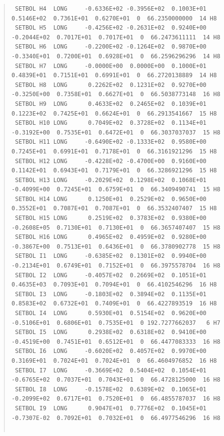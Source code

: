\documentclass[twoside,11pt]{article}
\newenvironment{myquote}{\begin{quote}\begin{small}}{\end{small}\end{quote}}
\renewcommand{\_}{\texttt{\symbol{95}}}
\begin{document}
\begin{landscape}
\begin{myquote}
\begin{verbatim}
 SETBOL H4  LONG     -0.6336E+02 -0.3956E+02  0.1003E+01  0.5146E+02  0.7361E+01  0.6270E+01  0  66.2350000000  14 H8
 SETBOL H5  LONG     -0.4256E+02 -0.2631E+02  0.9240E+00 -0.2044E+02  0.7017E+01  0.7017E+01  0  66.2473611111  14 H8
 SETBOL H6  LONG     -0.2200E+02 -0.1264E+02  0.9870E+00 -0.3340E+01  0.7200E+01  0.6928E+01  0  66.2596296296  14 H8
 SETBOL H7  LONG     -0.0000E+00  0.0000E+00  0.1000E+01  0.4839E+01  0.7151E+01  0.6991E+01  0  66.2720138889  14 H8
 SETBOL H8  LONG      0.2262E+02  0.1231E+02  0.9270E+00 -0.3250E+00  0.7358E+01  0.6627E+01  0  66.5038773148  16 H8
 SETBOL H9  LONG      0.4633E+02  0.2465E+02  0.1039E+01  0.1223E+02  0.7425E+01  0.6624E+01  0  66.2913541667  15 H8
 SETBOL H10 LONG      0.7049E+02  0.3728E+02  0.1134E+01 -0.3192E+00  0.7535E+01  0.6472E+01  0  66.3037037037  15 H8
 SETBOL H11 LONG     -0.6490E+02 -0.1333E+02  0.9580E+00  0.7245E+01  0.6991E+01  0.7178E+01  0  66.3161921296  15 H8
 SETBOL H12 LONG     -0.4228E+02 -0.4700E+00  0.9160E+00  0.1142E+01  0.6943E+01  0.7179E+01  0  66.3286921296  15 H8
 SETBOL H13 LONG     -0.2029E+02  0.1298E+02  0.1068E+01 -0.4099E+00  0.7245E+01  0.6759E+01  0  66.3409490741  15 H8
 SETBOL H14 LONG      0.1250E+01  0.2529E+02  0.9650E+00  0.3552E+01  0.7087E+01  0.7087E+01  0  66.3532407407  15 H8
 SETBOL H15 LONG      0.2519E+02  0.3783E+02  0.9380E+00 -0.2608E+05  0.7130E+01  0.7130E+01  0  66.3657407407  15 H8
 SETBOL H16 LONG      0.4965E+02  0.4959E+02  0.9280E+00 -0.3867E+00  0.7513E+01  0.6436E+01  0  66.3780902778  15 H8
 SETBOL I1  LONG     -0.6385E+02  0.1301E+02  0.9940E+00 -0.2134E+01  0.6749E+01  0.7152E+01  0  66.3975578704  16 H8
 SETBOL I2  LONG     -0.4057E+02  0.2669E+02  0.1051E+01  0.4635E+03  0.7093E+01  0.7094E+01  0  66.4102546296  16 H8
 SETBOL I3  LONG     -0.1803E+02  0.3894E+02  0.1135E+01  0.8583E+02  0.6732E+01  0.7409E+01  0  66.4227893519  16 H8
 SETBOL I4  LONG      0.5930E+01  0.5154E+02  0.9620E+00 -0.5106E+01  0.6806E+01  0.7535E+01  0 192.7277662037   6 H7
 SETBOL I5  LONG      0.2938E+02  0.6318E+02  0.9410E+00 -0.4519E+00  0.7451E+01  0.6512E+01  0  66.4477083333  16 H8
 SETBOL I6  LONG     -0.6020E+02  0.4057E+02  0.9970E+00  0.3169E+01  0.7024E+01  0.7024E+01  0  66.4604976852  16 H8
 SETBOL I7  LONG     -0.3669E+02  0.5404E+02  0.1054E+01 -0.6765E+02  0.7037E+01  0.7043E+01  0  66.4728125000  16 H8
 SETBOL I8  LONG     -0.1578E+02  0.6389E+02  0.1065E+01 -0.2099E+02  0.6717E+01  0.7520E+01  0  66.4855787037  16 H8
 SETBOL I9  LONG      0.9047E+01  0.7776E+02  0.1045E+01 -0.7307E-02  0.7092E+01  0.7032E+01  0  66.4977546296  16 H8


\end{verbatim}
\end{myquote}
\end{landscape}
\end{document}
